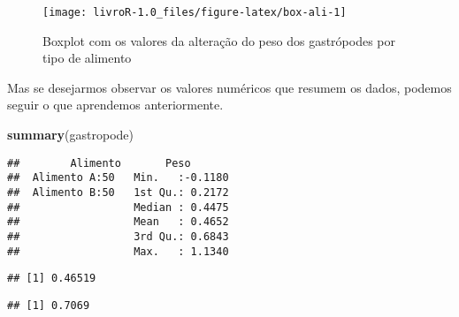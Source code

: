 \documentclass[14pt,titlepage, oneside, openany, a4paper]{book}
\newenvironment{Shaded}{\begin{snugshade}}{\end{snugshade}}
\newcommand{\KeywordTok}[1]{\textcolor[rgb]{0.13,0.29,0.53}{\textbf{#1}}}
\newcommand{\NormalTok}[1]{#1}
\newcommand{\OperatorTok}[1]{\textcolor[rgb]{0.81,0.36,0.00}{\textbf{#1}}}
\newcommand{\StringTok}[1]{\textcolor[rgb]{0.31,0.60,0.02}{#1}}
\begin{document}
\begin{figure}[H]

{\centering \texttt{[image: livroR-1.0\_files/figure-latex/box-ali-1]} 

}

\caption{Boxplot com os valores da alteração do peso dos gastrópodes por tipo de alimento}\label{fig:box-ali}
\end{figure}

Mas se desejarmos observar os valores numéricos que resumem os dados, podemos seguir o que aprendemos anteriormente.

\begin{Shaded}
\begin{Highlighting}[]
\KeywordTok{summary}\NormalTok{(gastropode)}
\end{Highlighting}
\end{Shaded}

\begin{verbatim}
##        Alimento       Peso        
##  Alimento A:50   Min.   :-0.1180  
##  Alimento B:50   1st Qu.: 0.2172  
##                  Median : 0.4475  
##                  Mean   : 0.4652  
##                  3rd Qu.: 0.6843  
##                  Max.   : 1.1340
\end{verbatim}

\begin{Shaded}
\end{Shaded}

\begin{verbatim}
## [1] 0.46519
\end{verbatim}

\begin{Shaded}
\end{Shaded}

\begin{verbatim}
## [1] 0.7069
\end{verbatim}

\begin{Shaded}
\end{Shaded}
\end{document}
